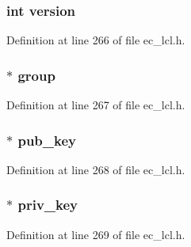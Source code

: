 \subsubsection[{\texorpdfstring{version}{version}}]{\setlength{\rightskip}{0pt plus 5cm}int version}\hypertarget{structec__key__st_aad880fc4455c253781e8968f2239d56f}{}\label{structec__key__st_aad880fc4455c253781e8968f2239d56f}


Definition at line 266 of file ec\+\_\+lcl.\+h.

\subsubsection[{\texorpdfstring{group}{group}}]{$\ast$ group}\hypertarget{structec__key__st_a0753ef53cd980706f98c274a742a2c19}{}\label{structec__key__st_a0753ef53cd980706f98c274a742a2c19}


Definition at line 267 of file ec\+\_\+lcl.\+h.

\subsubsection[{\texorpdfstring{pub\+\_\+key}{pub_key}}]{$\ast$ pub\+\_\+key}\hypertarget{structec__key__st_a8e6d80a43754470c4d47bf12759b7e70}{}\label{structec__key__st_a8e6d80a43754470c4d47bf12759b7e70}


Definition at line 268 of file ec\+\_\+lcl.\+h.

\subsubsection[{\texorpdfstring{priv\+\_\+key}{priv_key}}]{$\ast$ priv\+\_\+key}\hypertarget{structec__key__st_a7a27cca85dea48fc1c9086fe65651ec5}{}\label{structec__key__st_a7a27cca85dea48fc1c9086fe65651ec5}


Definition at line 269 of file ec\+\_\+lcl.\+h.

